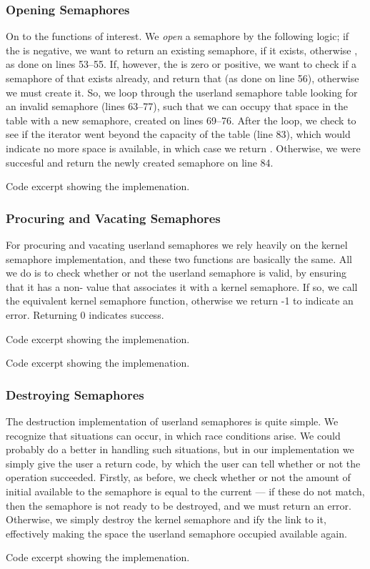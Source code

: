 \subsubsection{Opening Semaphores}
On to the functions of interest. We {\it open} a semaphore by the following
logic; if the  is negative, we want to return an existing
semaphore, if it exists, otherwise , as done on lines 53--55. If,
however, the  is zero or positive, we want to check if a semaphore
of that  exists already, and return that (as done on line 56),
otherwise we must create it. So, we loop through the userland semaphore table
looking for an invalid semaphore (lines 63--77), such that we can occupy that
space in the table with a new semaphore, created on lines 69--76. After the
loop, we check to see if the iterator went beyond the capacity of the table
(line 83), which would indicate no more space is available, in which case we
return . Otherwise, we were succesful and return the newly created
semaphore on line 84.

{Code excerpt showing the  implemenation.}

\subsubsection{Procuring and Vacating Semaphores}
For procuring and vacating userland semaphores we rely heavily on the kernel
semaphore implementation, and these two functions are basically the same. All
we do is to check whether or not the userland semaphore is valid, by ensuring
that it has a non- value that associates it with a kernel
semaphore. If so, we call the equivalent kernel semaphore function, otherwise
we return -1 to indicate an error. Returning 0 indicates success.

{Code excerpt showing the  implemenation.}

{Code excerpt showing the  implemenation.}

\subsubsection{Destroying Semaphores}
The destruction implementation of userland semaphores is quite simple. We
recognize that situations can occur, in which race conditions arise. We could
probably do a better in handling such situations, but in our implementation
we simply give the user a return code, by which the user can tell whether or
not the operation succeeded. Firstly, as before, we check whether or not the
amount of initial  available to the semaphore is equal to the
current  --- if these do not match, then the semaphore is not
ready to be destroyed, and we must return an error. Otherwise, we simply
destroy the kernel semaphore and ify the link to it, effectively
making the space the userland semaphore occupied available again.
 
{Code excerpt showing the  implemenation.}

